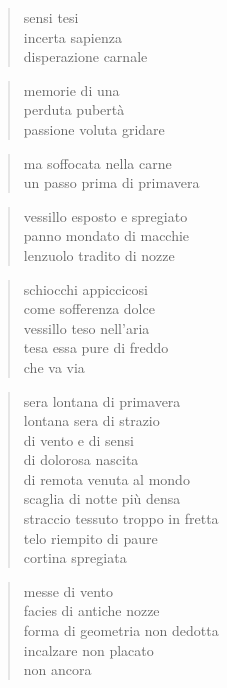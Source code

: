 \begin{verse}
    sensi tesi\\
    incerta sapienza\\
    disperazione carnale
\end{verse}

\begin{verse}
    memorie di una\\
    perduta pubertà\\
    passione voluta gridare
\end{verse}

\begin{verse}
    ma soffocata nella carne\\
    un passo prima di primavera
\end{verse}

\clearpage


\begin{verse}
    vessillo esposto e spregiato\\
    panno mondato di macchie\\
    lenzuolo tradito di nozze
\end{verse}

\begin{verse}
    schiocchi appiccicosi\\
    come sofferenza dolce\\
    vessillo teso nell'aria\\
    tesa essa pure di freddo\\
    che va via
\end{verse}

\begin{verse}
    sera lontana di primavera\\
    lontana sera di strazio\\
    di vento e di sensi\\
    di dolorosa nascita\\
    di remota venuta al mondo\\
    scaglia di notte più densa\\
    straccio tessuto troppo in fretta\\
    telo riempito di paure\\
    cortina spregiata
\end{verse}

\begin{verse}
    messe di vento\\
    facies di antiche nozze\\
    forma di geometria non dedotta\\
    incalzare non placato\\
    non ancora
\end{verse}

